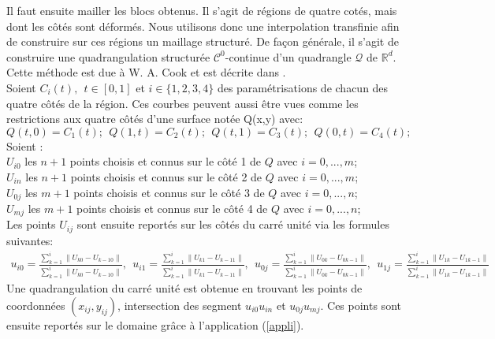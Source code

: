Il faut ensuite mailler les blocs obtenus. Il s'agit de régions de quatre cotés, mais dont les côtés sont déformés. Nous utilisons donc une interpolation transfinie afin de construire sur ces régions un maillage structuré. De façon générale, il s'agit de construire une quadrangulation structurée $\mathcal{C}^0$-continue d'un quadrangle $\mathcal{Q}$ de $\mathbb{R}^d$. Cette méthode est due à W. A. Cook \cite{ref4} et est décrite dans \cite{ref5}.\\
Soient $C_i(t),~~t\in[0,1]$ et $i\in\{1,2,3,4\}$ des paramétrisations de chacun des quatre côtés de la région. Ces courbes peuvent aussi être vues comme les restrictions aux quatre côtés d'une surface notée Q(x,y) avec:
$$Q(t,0)=C_1(t);~~Q(1,t)=C_2(t);~~Q(t,1)=C_3(t);~~Q(0,t)=C_4(t);$$
Soient :\\
$U_{i0}$ les $n+1$ points choisis et connus sur le côté 1 de $Q$ avec $i=0,...,m$;\\
$U_{in}$ les $n+1$ points choisis et connus sur le côté 2 de $Q$ avec $i=0,...,m$;\\
$U_{0j}$ les $m+1$ points choisis et connus sur le côté 3 de $Q$ avec $i=0,...,n$;\\
$U_{mj}$ les $m+1$ points choisis et connus sur le côté 4 de $Q$ avec $i=0,...,n$;\\
Les points $U_{ij}$ sont ensuite reportés sur les côtés du carré unité via les formules suivantes:
\tiny
\begin{eqnarray}
u_{i0}=\displaystyle\frac{\displaystyle\sum_{k=1}^i\|U_{k0}-U_{k-10}\|}{\displaystyle\sum_{k=1}^i\|U_{k0}-U_{k-10}\|},~~u_{i1}=\displaystyle\frac{\displaystyle\sum_{k=1}^i\|U_{k1}-U_{k-11}\|}{\displaystyle\sum_{k=1}^i\|U_{k1}-U_{k-11}\|},~~u_{0j}=\displaystyle\frac{\displaystyle\sum_{k=1}^i\|U_{0k}-U_{0k-1}\|}{\displaystyle\sum_{k=1}^i\|U_{0k}-U_{0k-1}\|},~~u_{1j}=\displaystyle\frac{\displaystyle\sum_{k=1}^i\|U_{1k}-U_{1k-1}\|}{\displaystyle\sum_{k=1}^i\|U_{1k}-U_{1k-1}\|}
\end{eqnarray}
\normalsize
Une quadrangulation du carré unité est obtenue en trouvant les points de coordonnées $(x_{ij},y_{ij})$, intersection des segment $u_{i0}u_{in}$ et $u_{0j}u_{mj}$. Ces points sont ensuite reportés sur le domaine grâce à l'application (\ref{appli}).

